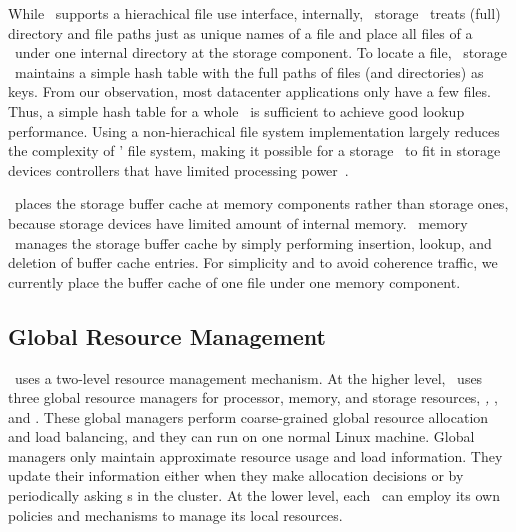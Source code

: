 \documentclass[10pt,times,twocolumn]{z2-article}
\begin{document}
{{{{{{{While \lego\ supports a hierachical file use interface,
internally, \lego\ storage \microos\ treats (full) directory and file paths just as unique names of a file
and place all files of a \vnode\ under one internal directory at the storage component.
To locate a file, \lego\ storage \microos\ maintains a simple hash table with the full paths of files (and directories) as keys.
From our observation, most datacenter applications only have a few files.
Thus, a simple hash table for a whole \vnode\ is sufficient to achieve good lookup performance.
Using a non-hierachical file system implementation largely reduces the complexity of \lego{}' file system,
making it possible for a storage \microos\ to fit in storage devices controllers that have limited processing power~\cite{Willow}.

\lego\ places the storage buffer cache at memory components
rather than storage ones, because storage devices have limited amount of internal memory.
\lego\ memory \microos\ manages the storage buffer cache by simply performing insertion, lookup, and deletion of buffer cache entries.
For simplicity and to avoid coherence traffic, we currently place the buffer cache of one file
under one memory component.



\subsection{Global Resource Management}
\label{sec:grm}
\lego\ uses a two-level resource management mechanism.
At the higher level, \lego\ uses three global resource managers for processor, memory, and storage resources, 
{\em \gpm, \gmm}, and {\em \gsm}.
These global managers perform coarse-grained global resource allocation and load balancing,
and they can run on one normal Linux machine.
Global managers only maintain approximate resource usage and load information.
They update their information either when they make allocation decisions 
or by periodically asking \microos{}s in the cluster.
At the lower level, each \microos\ can employ its own policies and mechanisms to manage its local resources.

}}}}}}}
\end{document}
